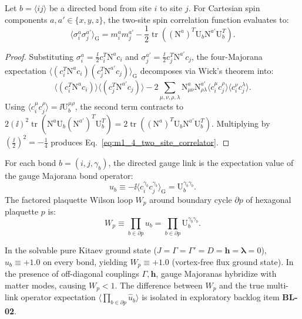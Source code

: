 \begin{definition}
\label{def:m1_4_spin_correlator}
Let $b = \langle ij \rangle$ be a directed bond from site $i$ to site $j$. For Cartesian spin components $a, a' \in \{x, y, z\}$, the two-site spin correlation function evaluates to:
\begin{equation}
\label{eq:m1_4_two_site_correlator}
\langle \sigma_i^a \sigma_j^{a'} \rangle_{\mathrm{G}} = m_i^a m_j^{a'} - \frac{1}{2} \operatorname{tr}\left( (\mathrm{N}^a)^T \mathrm{U}_b \mathrm{N}^{a'} \mathrm{U}_b^T \right).
\end{equation}
\end{definition}
\begin{proof}
Substituting $\sigma_i^a = \frac{\ii}{2} c_i^T \mathrm{N}^a c_i$ and $\sigma_j^{a'} = \frac{\ii}{2} c_j^T \mathrm{N}^{a'} c_j$, the four-Majorana expectation $\langle (c_i^T \mathrm{N}^a c_i)(c_j^T \mathrm{N}^{a'} c_j) \rangle_{\mathrm{G}}$ decomposes via Wick's theorem into:
\begin{equation}
\label{eq:m1_4_wick_spin_expansion}
\langle (c_i^T \mathrm{N}^a c_i) \rangle \langle (c_j^T \mathrm{N}^{a'} c_j) \rangle - 2 \sum_{\mu,\nu,\rho,\lambda} \mathrm{N}_{\mu\nu}^a \mathrm{N}_{\rho\lambda}^{a'} \langle c_i^\mu c_j^\rho \rangle \langle c_i^\nu c_j^\lambda \rangle.
\end{equation}
Using $\langle c_i^\mu c_j^\rho \rangle = \ii \mathrm{U}_b^{\mu\rho}$, the second term contracts to $2 (\ii)^2 \operatorname{tr}(\mathrm{N}^a \mathrm{U}_b (\mathrm{N}^{a'})^T \mathrm{U}_b^T) = 2 \operatorname{tr}((\mathrm{N}^a)^T \mathrm{U}_b \mathrm{N}^{a'} \mathrm{U}_b^T)$. Multiplying by $(\frac{\ii}{2})^2 = -\frac{1}{4}$ produces Eq.~\eqref{eq:m1_4_two_site_correlator}.
\end{proof}

\begin{definition}
\label{def:m1_4_wilson_loop}
For each bond $b = (i, j, \gamma_b)$, the directed gauge link is the expectation value of the gauge Majorana bond operator:
\begin{equation}
\label{eq:m1_4_gauge_link}
u_b \equiv -\ii \langle c_i^{\gamma_b} c_j^{\gamma_b} \rangle_{\mathrm{G}} = \mathrm{U}_b^{\gamma_b \gamma_b}.
\end{equation}
The factored plaquette Wilson loop $W_p$ around boundary cycle $\partial p$ of hexagonal plaquette $p$ is:
\begin{equation}
\label{eq:m1_4_factored_wilson_loop}
W_p \equiv \prod_{b \in \partial p} u_b = \prod_{b \in \partial p} \mathrm{U}_b^{\gamma_b \gamma_b}.
\end{equation}
\end{definition}
In the solvable pure Kitaev ground state ($J = \Gamma = \Gamma' = D = \mathbf{h} = \boldsymbol{\lambda} = 0$), $u_b \equiv +1.0$ on every bond, yielding $W_p \equiv +1.0$ (vortex-free flux ground state). In the presence of off-diagonal couplings $\Gamma, \mathbf{h}$, gauge Majoranas hybridize with matter modes, causing $W_p < 1$. The difference between $W_p$ and the true multi-link operator expectation $\langle \prod_{b \in \partial p} \hat{u}_b \rangle$ is isolated in exploratory backlog item \textbf{BL-02}.

